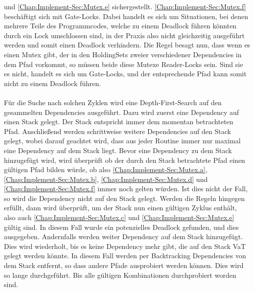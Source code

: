 und \eqref{Chap:Implement-Sec:Mutex.e} sichergestellt.
\eqref{Chap:Implement-Sec:Mutex.f} beschäftigt sich mit Gate-Locks. 
Dabei handelt es sich um Situationen, bei denen mehrere Teile des Programmcodes,
welche zu einem Deadlock führen könnten durch ein Lock umschlossen sind, 
in der Praxis also nicht gleichzeitig ausgeführt werden und somit einen Deadlock 
verhindern.
Die Regel besagt nun, dass wenn es einen Mutex gibt,
der in den HoldingSets zweier verschiedener Dependencies in dem Pfad vorkommt, so müssen
beide diese Mutexe Reader-Locks sein. Sind sie es nicht, handelt es sich um Gate-Locks, und
der entsprechende Pfad kann somit nicht zu einem Deadlock führen.\\\\
Für die Suche nach solchen Zyklen wird eine Depth-First-Search auf den gesammelten 
Dependencies ausgeführt. Dazu wird zuerst eine Dependency auf einen Stack gelegt. 
Der Stack entspricht immer dem momentan
betrachteten Pfad. Anschließend werden schrittweise weitere Dependencies auf den 
Stack gelegt, wobei darauf geachtet wird, dass aus jeder Routine immer nur maximal 
eine Dependency auf dem Stack liegt. Bevor eine Dependency zu dem Stack 
hinzugefügt wird, wird überprüft ob der durch den Stack betrachtete Pfad 
einen gültigen Pfad bilden würde, ob also \eqref{Chap:Implement-Sec:Mutex.a}, 
\eqref{Chap:Implement-Sec:Mutex.b}, \eqref{Chap:Implement-Sec:Mutex.d} und 
\eqref{Chap:Implement-Sec:Mutex.f} immer noch gelten würden. Ist dies nicht
der Fall, so wird die Dependency nicht auf den Stack gelegt. Werden die 
Regeln hingegen erfüllt, dann wird überprüft, um der Stack nun einen gültigen
Zyklus enthält, also auch \eqref{Chap:Implement-Sec:Mutex.c} und \eqref{Chap:Implement-Sec:Mutex.e}
gültig sind. In diesem Fall wurde ein potenzielles Deadlock gefunden, und dies 
ausgegeben. Andernfalls werden weiter Dependency auf dem Stack hinzugefügt. 
Dies wird wiederholt, bis es keine Dependency mehr gibt, die auf den Stack VaT
gelegt werden könnte. In diesem Fall werden per Backtracking Dependencies 
von dem Stack entfernt, so dass andere Pfade ausprobiert werden können.
Dies wird so lange durchgeführt. Bis alle gültigen Kombinationen durchprobiert 
worden sind.

